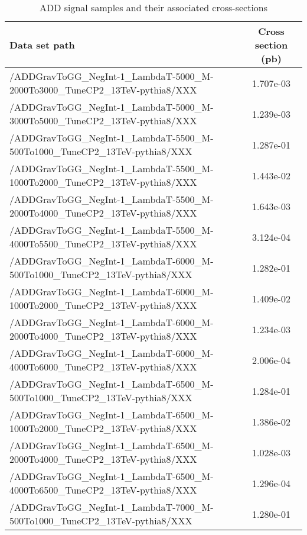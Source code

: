 \begin{landscape}
\begin{table}[!htbp]
       \caption{ ADD signal samples and their associated cross-sections }
       \centering
       \vspace{\baselineskip}
       \begin{tabular}{lc}
       \hline \hline
       Data set path & Cross section (pb)\\
       \hline


       /ADDGravToGG\_NegInt-1\_LambdaT-5000\_M-2000To3000\_TuneCP2\_13TeV-pythia8/XXX &  1.707e-03\\
       /ADDGravToGG\_NegInt-1\_LambdaT-5000\_M-3000To5000\_TuneCP2\_13TeV-pythia8/XXX &  1.239e-03\\
       /ADDGravToGG\_NegInt-1\_LambdaT-5500\_M-500To1000\_TuneCP2\_13TeV-pythia8/XXX &  1.287e-01\\
       /ADDGravToGG\_NegInt-1\_LambdaT-5500\_M-1000To2000\_TuneCP2\_13TeV-pythia8/XXX &  1.443e-02\\
       /ADDGravToGG\_NegInt-1\_LambdaT-5500\_M-2000To4000\_TuneCP2\_13TeV-pythia8/XXX &  1.643e-03\\
       /ADDGravToGG\_NegInt-1\_LambdaT-5500\_M-4000To5500\_TuneCP2\_13TeV-pythia8/XXX &  3.124e-04\\
       /ADDGravToGG\_NegInt-1\_LambdaT-6000\_M-500To1000\_TuneCP2\_13TeV-pythia8/XXX &  1.282e-01\\
       /ADDGravToGG\_NegInt-1\_LambdaT-6000\_M-1000To2000\_TuneCP2\_13TeV-pythia8/XXX &  1.409e-02\\
       /ADDGravToGG\_NegInt-1\_LambdaT-6000\_M-2000To4000\_TuneCP2\_13TeV-pythia8/XXX &  1.234e-03\\
       /ADDGravToGG\_NegInt-1\_LambdaT-6000\_M-4000To6000\_TuneCP2\_13TeV-pythia8/XXX &  2.006e-04\\
       /ADDGravToGG\_NegInt-1\_LambdaT-6500\_M-500To1000\_TuneCP2\_13TeV-pythia8/XXX &  1.284e-01\\
       /ADDGravToGG\_NegInt-1\_LambdaT-6500\_M-1000To2000\_TuneCP2\_13TeV-pythia8/XXX &  1.386e-02\\
       /ADDGravToGG\_NegInt-1\_LambdaT-6500\_M-2000To4000\_TuneCP2\_13TeV-pythia8/XXX &  1.028e-03\\
       /ADDGravToGG\_NegInt-1\_LambdaT-6500\_M-4000To6500\_TuneCP2\_13TeV-pythia8/XXX &  1.296e-04\\
       /ADDGravToGG\_NegInt-1\_LambdaT-7000\_M-500To1000\_TuneCP2\_13TeV-pythia8/XXX &  1.280e-01\\

\end{tabular}
\end{table}
\end{landscape}
